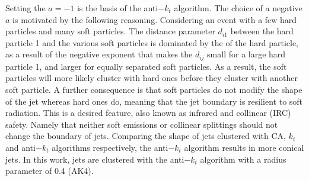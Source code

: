 Setting the $a=-1$ is the basis of the anti$-k_t$ algorithm. 
The choice of a negative $a$ is motivated by the following reasoning. 
Considering an event with a few hard particles and many soft particles. 
The distance parameter $d_{i1}$ between the hard particle 1 and the various soft particles is dominated by the \pt of the hard particle, as a result of the negative exponent that makes the $d_{ij}$ small for a large \pt hard particle 1, and larger for equally separated soft particles. 
As a result, the soft particles will more likely cluster with hard ones before they cluster with another soft particle. 
A further consequence is that soft particles do not modify the shape of the jet whereas hard ones do, meaning that the jet boundary is resilient to soft radiation. 
This is a desired feature, also known as infrared and collinear (IRC) safety. Namely that neither soft emissions or collinear splittings should not change the boundary of jets. 
Comparing the shape of jets clustered with CA, $k_t$ and anti$-k_t$ algorithms respectively, the anti$-k_t$ algorithm results in more conical jets.
In this work, jets are clustered with the anti$-k_t$ algorithm with a radius parameter of 0.4 (AK4). 

